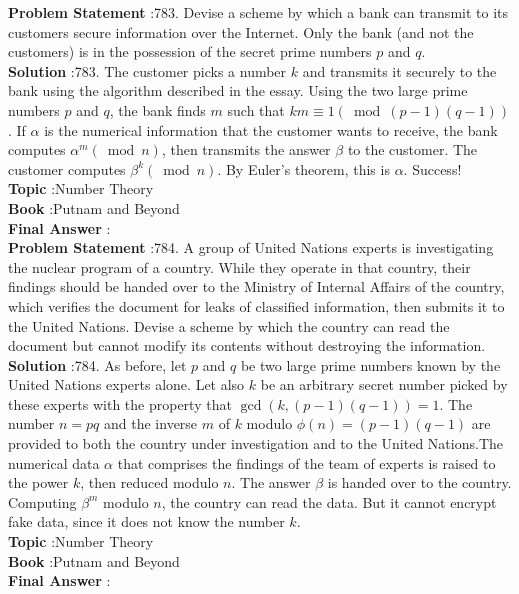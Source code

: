 \documentclass[10pt]{article}
\begin{document}
\textbf{Problem Statement} :783. Devise a scheme by which a bank can transmit to its customers secure information over the Internet. Only the bank (and not the customers) is in the possession of the secret prime numbers $p$ and $q$.\\
\textbf{Solution} :783. The customer picks a number $k$ and transmits it securely to the bank using the algorithm described in the essay. Using the two large prime numbers $p$ and $q$, the bank finds $m$ such that $k m \equiv 1(\bmod (p-1)(q-1))$. If $\alpha$ is the numerical information that the customer wants to receive, the bank computes $\alpha^{m}(\bmod n)$, then transmits the answer $\beta$ to the customer. The customer computes $\beta^{k}(\bmod n)$. By Euler's theorem, this is $\alpha$. Success!\\
\textbf{Topic} :Number Theory\\
\textbf{Book} :Putnam and Beyond\\
\textbf{Final Answer} :\\


\textbf{Problem Statement} :784. A group of United Nations experts is investigating the nuclear program of a country. While they operate in that country, their findings should be handed over to the Ministry of Internal Affairs of the country, which verifies the document for leaks of classified information, then submits it to the United Nations. Devise a scheme by which the country can read the document but cannot modify its contents without destroying the information.\\
\textbf{Solution} :784. As before, let $p$ and $q$ be two large prime numbers known by the United Nations experts alone. Let also $k$ be an arbitrary secret number picked by these experts with the property that $\operatorname{gcd}(k,(p-1)(q-1))=1$. The number $n=p q$ and the inverse $m$ of $k$ modulo $\phi(n)=(p-1)(q-1)$ are provided to both the country under investigation and to the United Nations.The numerical data $\alpha$ that comprises the findings of the team of experts is raised to the power $k$, then reduced modulo $n$. The answer $\beta$ is handed over to the country. Computing $\beta^{m}$ modulo $n$, the country can read the data. But it cannot encrypt fake data, since it does not know the number $k$.\\
\textbf{Topic} :Number Theory\\
\textbf{Book} :Putnam and Beyond\\
\textbf{Final Answer} :\\
\end{document}
